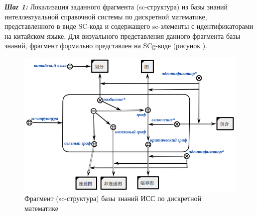 \textbf{\textit{Шаг 1:}} Локализация заданного фрагмента (sc-структура) из базы знаний интеллектуальной справочной системы по дискретной математике, представленного в виде SC-кода и содержащего sc-элементы с идентификаторами на китайском языке. Для визуального представления данного фрагмента базы знаний, фрагмент формально представлен на SCg-коде (рисунок \textit{}).
\begin{figure}[H]
	\centering
	\includegraphics[scale=0.7]{images/part4/chapter_chinese/fragment_knowledge_base.png}
	\caption{Фрагмент (sc-структура) базы знаний ИСС по дискретной математике}
	\label{fig:knowledge-base-fragment}
\end{figure}

